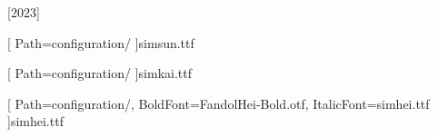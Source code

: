 [2023]

\setmainfont{Times New Roman}

    


[
    Path=configuration/
    ]{simsun.ttf}

[
    Path=configuration/
    ]{simkai.ttf}
    
[
    Path=configuration/,
    BoldFont=FandolHei-Bold.otf,
    ItalicFont=simhei.ttf
    ]{simhei.ttf}

\newcommand\kaishu{\CJKfamily{kai}}
\newcommand\songti{\CJKfamily{song}}
\newcommand\heiti{\CJKfamily{hei}}
